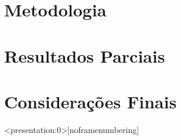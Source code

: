\documentclass[aspectratio=43]{beamer}
\begin{document}
\section{Metodologia}

\section{Resultados Parciais}

\section{Considerações Finais}




\begin{frame}<presentation:0>[noframenumbering]

\end{frame}

\end{document}
